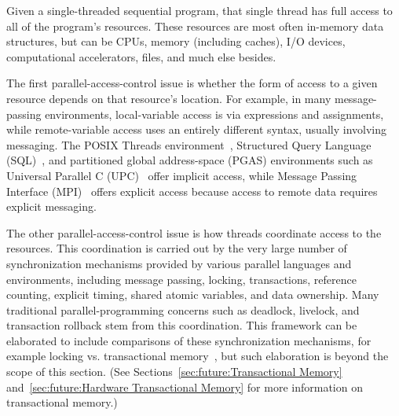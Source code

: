 Given a single-threaded sequential program, that single
thread has full access to all of the program's resources.
These resources are most often in-memory data structures, but can be CPUs,
memory (including caches), I/O devices, computational accelerators, files,
and much else besides.

The first parallel-access-control issue is whether the form of access to
a given resource depends on that resource's location.
For example, in many message-passing environments, local-variable
access is via expressions and assignments,
while remote-variable access uses an entirely different
syntax, usually involving messaging.
The POSIX Threads environment~\cite{OpenGroup1997pthreads},
Structured Query Language (SQL)~\cite{DIS9075SQL92}, and
partitioned global address-space (PGAS) environments
such as Universal Parallel C (UPC)~\cite{ElGhazawi2003UPC,UPCConsortium2013}
offer implicit access,
while Message Passing Interface (MPI)~\cite{MPIForum2008} offers
explicit access because access to remote data requires explicit
messaging.

The other parallel-access-control issue is how threads coordinate
access to the resources.
This coordination is carried out by
the very large number of synchronization mechanisms
provided by various parallel languages and environments,
including message passing, locking, transactions,
reference counting, explicit timing, shared atomic variables, and data
ownership.
Many traditional parallel-programming concerns such as deadlock,
livelock, and transaction rollback stem from this coordination.
This framework can be elaborated to include comparisons
of these synchronization mechanisms, for example locking vs. transactional
memory~\cite{McKenney2007PLOSTM}, but such elaboration is beyond the
scope of this section.
(See
Sections~\ref{sec:future:Transactional Memory}
and~\ref{sec:future:Hardware Transactional Memory}
for more information on transactional memory.)

\QuickQuizEnd

